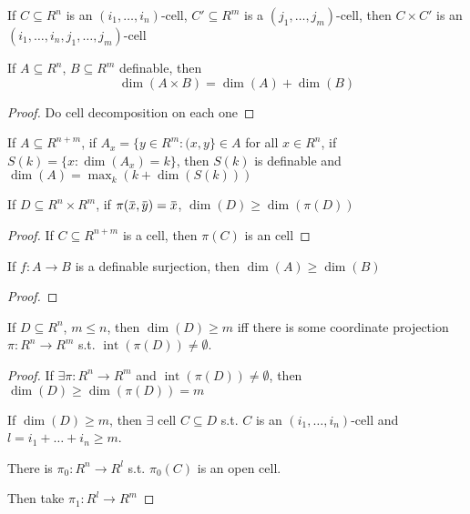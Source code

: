\documentclass[11pt]{article}
\DeclareMathOperator{\tint}{\text{int}}
\begin{document}
\begin{lemma}[]
If \(C\subseteq R^n\) is an \((i_1,\dots,i_n)\)-cell, \(C'\subseteq R^m\) is a \((j_1,\dots,j_m)\)-cell, then
\(C\times C'\) is an \((i_1,\dots,i_n,j_1,\dots,j_m)\)-cell
\end{lemma}

\begin{theorem}[]
If \(A\subseteq R^n\), \(B\subseteq R^m\) definable, then
\begin{equation*}
\dim(A\times B)=\dim(A)+\dim(B)
\end{equation*}
\end{theorem}

\begin{proof}
Do cell decomposition on each one
\end{proof}

\begin{theorem}[]
If \(A\subseteq R^{n+m}\), if \(A_x=\{y\in R^m:(x,y\}\in A\) for all \(x\in R^n\), if
\(S(k)=\{x:\dim(A_x)=k\}\), then \(S(k)\) is definable and
\(\dim(A)=\max_k(k+\dim(S(k)))\)
\end{theorem}

\begin{lemma}[]
If \(D\subseteq R^n\times R^m\), if \(\pi(\barx,\bary)=\barx\), \(\dim(D)\ge\dim(\pi(D))\)
\end{lemma}

\begin{proof}
If \(C\subseteq R^{n+m}\) is a cell, then \(\pi(C)\) is an cell
\end{proof}

\begin{theorem}[]
If \(f:A\to B\) is a definable surjection, then \(\dim(A)\ge\dim(B)\)
\end{theorem}

\begin{proof}

\end{proof}

\begin{theorem}[]
If \(D\subseteq R^n\), \(m\le n\), then \(\dim(D)\ge m\) iff there is some coordinate projection \(\pi:R^n\to R^m\)
s.t. \(\tint(\pi(D))\neq\emptyset\).
\end{theorem}

\begin{proof}
If \(\exists\pi:R^n\to R^m\) and \(\tint(\pi(D))\neq\emptyset\), then \(\dim(D)\ge\dim(\pi(D))=m\)

If \(\dim(D)\ge m\), then \(\exists\) cell \(C\subseteq D\) s.t. \(C\) is an \((i_1,\dots,i_n)\)-cell
and \(l=i_1+\dots+i_n\ge m\).

There is \(\pi_0:R^n\to R^l\) s.t. \(\pi_0(C)\) is an open cell.

Then take \(\pi_1:R^l\to R^m\)
\end{proof}
\end{document}
